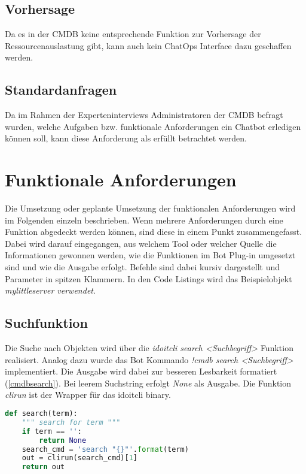 \subsection{Vorhersage}
 Da es in der \acs{CMDB} keine entsprechende Funktion zur Vorhersage der Ressourcenauslastung gibt, kann auch kein ChatOps Interface dazu geschaffen werden.


\subsection{Standardanfragen}
Da im Rahmen der Experteninterviews Administratoren der \acs{CMDB} befragt wurden, welche Aufgaben bzw. funktionale Anforderungen ein Chatbot erledigen können soll, kann diese Anforderung als erfüllt betrachtet werden. 



\section{Funktionale Anforderungen}
Die Umsetzung oder geplante Umsetzung der funktionalen Anforderungen wird im Folgenden einzeln beschrieben. Wenn mehrere Anforderungen durch eine Funktion abgedeckt werden können, sind diese in einem Punkt zusammengefasst. Dabei wird darauf eingegangen, aus welchem Tool oder welcher Quelle die Informationen gewonnen werden, wie die Funktionen im Bot Plug-in umgesetzt sind und wie die Ausgabe erfolgt. Befehle sind dabei kursiv dargestellt und Parameter in spitzen Klammern. In den Code Listings wird das Beispielobjekt \textit{mylittleserver verwendet}.

\subsection{Suchfunktion}
Die Suche nach Objekten wird über die \textit{idoitcli search <Suchbegriff>} Funktion realisiert. Analog dazu wurde das Bot Kommando \textit{!cmdb search <Suchbegriff>} implementiert. Die Ausgabe wird dabei zur besseren Lesbarkeit formatiert (\autoref{cmdbsearch}). Bei leerem Suchstring erfolgt \textit{None} als Ausgabe. Die Funktion \textit{clirun} ist der Wrapper für das idoitcli binary.

\newpage
\begin{lstlisting}[language=python, label=cmdbsearch, caption=Suchfunktion]
def search(term):
    """ search for term """
    if term == '':
        return None
    search_cmd = 'search "{}"'.format(term)
    out = clirun(search_cmd)[1]
    return out
\end{lstlisting}


